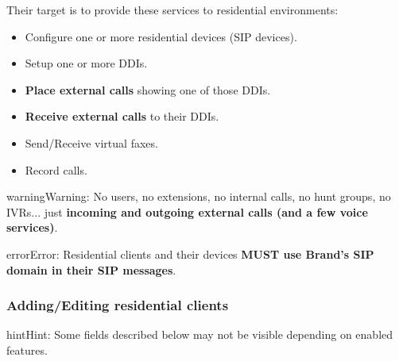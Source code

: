 \documentclass[letterpaper,10pt,english]{sphinxmanual}
\begin{document}
Their target is to provide these services to residential environments:
\begin{itemize}
\item {} 
Configure one or more residential devices (SIP devices).

\item {} 
Setup one or more DDIs.

\item {} 
\textbf{Place external calls} showing one of those DDIs.

\item {} 
\textbf{Receive external calls} to their DDIs.

\item {} 
Send/Receive virtual faxes.

\item {} 
Record calls.

\end{itemize}

\begin{notice}{warning}{Warning:}
No users, no extensions, no internal calls, no hunt groups, no IVRs... just \textbf{incoming and outgoing external
calls (and a few voice services)}.
\end{notice}

\begin{notice}{error}{Error:}
Residential clients and their devices \textbf{MUST use Brand's SIP domain in their SIP messages}.
\end{notice}


\subsubsection{Adding/Editing residential clients}
\label{administration_portal/brand/clients/residential:adding-editing-residential-clients}
\begin{notice}{hint}{Hint:}
Some fields described below may not be visible depending on enabled features.
\end{notice}
\end{document}

